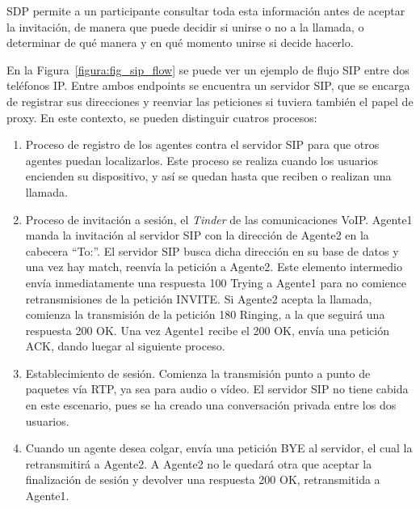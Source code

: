 \documentclass[a4paper, 12pt]{book}
\begin{document}
SDP permite a un participante consultar toda esta información antes de aceptar la invitación, de manera que puede decidir si unirse o no a la llamada, o determinar de qué manera y en qué momento unirse si decide hacerlo.

En la Figura~\ref{figura:fig_sip_flow} se puede ver un ejemplo de flujo SIP entre dos teléfonos IP. Entre ambos endpoints se encuentra un servidor SIP, que se encarga de registrar sus direcciones y reenviar las peticiones si tuviera también el papel de proxy. En este contexto, se pueden distinguir cuatros procesos:
\begin{enumerate}
  \item Proceso de registro de los agentes contra el servidor SIP para que otros agentes puedan localizarlos. Este proceso se realiza cuando los usuarios encienden su dispositivo, y así se quedan hasta que reciben o realizan una llamada.
  \item Proceso de invitación a sesión, el \emph{Tinder} de las comunicaciones VoIP. Agente1 manda la invitación al servidor SIP con la dirección de Agente2 en la cabecera ``To:''. El servidor SIP busca dicha dirección en su base de datos y una vez hay match, reenvía la petición a Agente2. Este elemento intermedio envía inmediatamente una respuesta 100 Trying a Agente1 para no comience retransmisiones de la petición INVITE. Si Agente2 acepta la llamada, comienza la transmisión de la petición 180 Ringing, a la que seguirá una respuesta 200 OK. Una vez Agente1 recibe el 200 OK, envía una petición ACK, dando luegar al siguiente proceso.
  \item Establecimiento de sesión. Comienza la transmisión punto a punto de paquetes vía RTP, ya sea para audio o vídeo. El servidor SIP no tiene cabida en este escenario, pues se ha creado una conversación privada entre los dos usuarios.
  \item Cuando un agente desea colgar, envía una petición BYE al servidor, el cual la retransmitirá a Agente2. A Agente2 no le quedará otra que aceptar la finalización de sesión y devolver una respuesta 200 OK, retransmitida a Agente1.
\end{enumerate}
\end{document}
